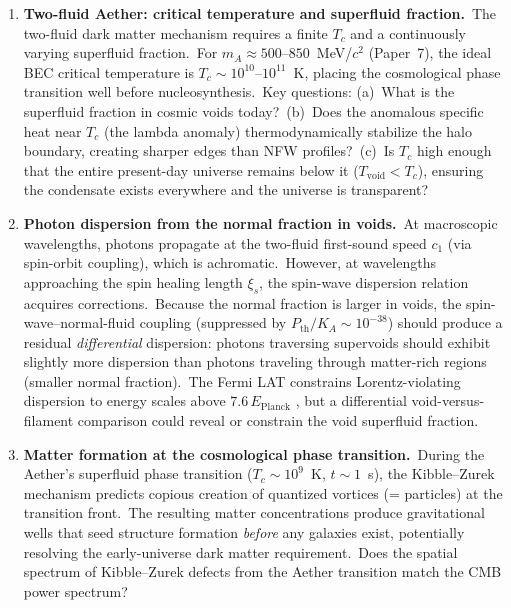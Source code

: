 ﻿\documentclass[12pt,letterpaper]{article}
\newcommand{\Ka}{K_{\!A}}
\begin{document}
\begin{enumerate}[leftmargin=2em]
  \item \textbf{Two-fluid Aether: critical temperature and superfluid
    fraction.}\ The two-fluid dark matter mechanism requires a finite
    $T_c$ and a continuously varying superfluid fraction.\ For
    $m_A \approx 500$--$850$~MeV/$c^2$ (Paper~7), the ideal BEC critical
    temperature is $T_c \sim 10^{10}$--$10^{11}$~K, placing the cosmological
    phase transition well before nucleosynthesis.\ Key questions: (a)~What is
    the superfluid fraction in cosmic voids today?\ (b)~Does the
    anomalous specific heat near $T_c$ (the lambda anomaly)
    thermodynamically stabilize the halo boundary, creating sharper
    edges than NFW profiles?\ (c)~Is $T_c$ high enough that the
    entire present-day universe remains below it ($T_{\mathrm{void}}
    < T_c$), ensuring the condensate exists everywhere and the universe
    is transparent?

  \item \textbf{Photon dispersion from the normal fraction in voids.}\
    At macroscopic wavelengths, photons propagate at the two-fluid
    first-sound speed $c_1$ (via spin-orbit coupling), which is
    achromatic.\ However, at wavelengths approaching the spin healing
    length $\xi_s$, the spin-wave dispersion relation acquires
    corrections.\ Because the normal fraction is larger in voids, the
    spin-wave--normal-fluid coupling (suppressed by
    $P_{\mathrm{th}}/\Ka \sim 10^{-38}$) should produce a residual
    \emph{differential} dispersion: photons traversing supervoids
    should exhibit slightly more dispersion than photons traveling
    through matter-rich regions (smaller normal fraction).\ The Fermi
    LAT constrains Lorentz-violating dispersion to energy scales above
    $7.6\,E_{\mathrm{Planck}}$ \cite{vasileiou2013}, but a differential
    void-versus-filament comparison could reveal or constrain the void
    superfluid fraction.

  \item \textbf{Matter formation at the cosmological phase transition.}\
    During the Aether's superfluid phase transition ($T_c \sim
    10^9$~K, $t \sim 1$~s), the Kibble--Zurek mechanism
    \cite{bauerle1996,ruutu1996} predicts copious creation of
    quantized vortices (= particles) at the transition front.\ The
    resulting matter concentrations produce gravitational wells that
    seed structure formation \emph{before} any galaxies exist,
    potentially resolving the early-universe dark matter requirement.\
    Does the spatial spectrum of Kibble--Zurek defects from the Aether
    transition match the CMB power spectrum?


\end{enumerate}
\end{document}
